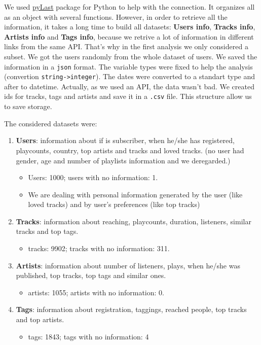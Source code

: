 \documentclass{article}
\begin{document}
We used \href{https://github.com/pylast/pylast}{pyLast}
package for Python to help with the connection. It organizes all as an object
with several functions. However, in order to retrieve all the information, it
takes a long time to build all datasets: \textbf{Users info}, \textbf{Tracks
info}, \textbf{Artists info} and \textbf{Tags info}, because we retrive a lot
of information in different links from the same API. That's why in the first
analysis we only considered a subset. We got the users randomly from the whole
dataset of users. We saved the information in a \lstinline{json} format. The
variable types were fixed to help the analysis (convertion
\lstinline{string->integer}). The dates were converted to a standart type and
after to datetime. Actually, as we used an API, the data wasn't bad. We
created ids for tracks, tags and artists and save it in a \lstinline{.csv}
file. This structure allow us to save storage. 

The considered datasets were: 

\begin{enumerate}
  \item \textbf{Users}: information about if is subscriber, when he/she 
  has registered, playcounts, country, top artists and tracks and loved
  tracks. (no user had gender, age and number of playlists information and
  we deregarded.)
  \begin{itemize}
    \item Users: 1000; users with no information: 1.
    \item We are dealing with personal information generated by the user (like loved
    tracks) and by user's preferences (like top tracks)    
  \end{itemize}
  \item \textbf{Tracks}: information about reaching, playcounts, duration,
  listeners, similar tracks and top tags.
  \begin{itemize}
    \item tracks: 9902; tracks with no information: 311.
  \end{itemize} 
  \item \textbf{Artists}: information about number of listeners, plays, when
  he/she was published, top tracks, top tags and similar ones.
  \begin{itemize}
    \item artists: 1055; artists with no information: 0.
  \end{itemize}
  \item \textbf{Tags}: information about registration, taggings, reached
  people, top tracks and top artists.
  \begin{itemize}
    \item tags: 1843; tags with no information: 4
  \end{itemize} 
\end{enumerate}
\end{document}
